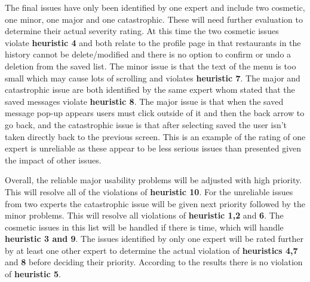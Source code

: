 \documentclass[a4 paper, 12pt]{article}
\begin{document}
     The final issues have only been identified by one expert and include two cosmetic, one minor, one major and one catastrophic. These will need further evaluation to determine their actual severity rating. At this time the two cosmetic issues violate \textbf{heuristic 4} and both relate to the profile page in that restaurants in the history cannot be delete/modified and there is no option to confirm or undo a deletion from the saved list. The minor issue is that the text of the menu is too small which may cause lots of scrolling and violates \textbf{heuristic 7}. The major and catastrophic issue are both identified by the same expert whom stated that the saved messages violate \textbf{heuristic 8}. The major issue is that when the saved message pop-up appears users must click outside of it and then the back arrow to go back, and the catastrophic issue is that after selecting saved the user isn't taken directly back to the previous screen. This is an example of the rating of one expert is unreliable as these appear to be less serious issues than presented given the impact of other issues. 

     Overall, the reliable major usability problems will be adjusted with high priority. This will resolve all of the violations of \textbf{heuristic 10}. For the unreliable issues from two experts the catastrophic issue will be given next priority followed by the minor problems. This will resolve all violations of \textbf{heuristic 1,2} and \textbf{6}. The cosmetic issues in this list will be handled if there is time, which will handle \textbf{heuristic 3 and 9}. The issues identified by only one expert will be rated further by at least one other expert to determine the actual violation of \textbf{heuristics 4,7} and \textbf{8} before deciding their priority. According to the results there is no violation of \textbf{heuristic 5}.
\end{document}
